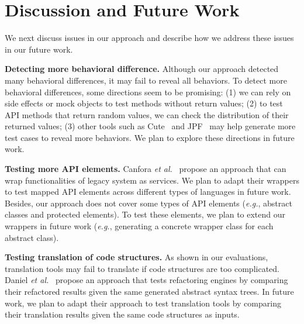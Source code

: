 

\section{Discussion and Future Work}
\label{sec:discuss}

We next discuss issues in our approach and describe how we address
these issues in our future work.

\textbf{Detecting more behavioral difference.} Although our approach detected many behavioral differences, it may fail to reveal all behaviors. To detect more behavioral differences, some directions seem to be promising: (1) we can rely on side effects or  mock objects to test methods without return values; (2) to test API methods that return random values, we can check the distribution of their returned values; (3) other tools such as Cute~\cite{koushik:cute} and JPF~\cite{visser2003mcp} may help generate more test cases to reveal more behaviors. We plan to explore these directions in future work.

\textbf{Testing more API elements.} Canfora \emph{et al.}~\cite{CanforaFFT08} propose an approach that can wrap functionalities of legacy system as services. We plan to adapt their wrappers to test mapped API elements across different types of languages in future work. Besides, our approach does not cover some types of API elements (\emph{e.g.}, abstract classes and protected elements). To test these elements, we plan to extend our wrappers in future work (\emph{e.g.}, generating a concrete wrapper class for each abstract class).

\textbf{Testing translation of code structures.} As shown in our evaluations, translation tools may fail to translate if code structures are too complicated. Daniel \emph{et al.}~\cite{daniel2007automated} propose an approach that tests refactoring engines by comparing their refactored results given the same generated abstract syntax trees. In future work, we plan to adapt their approach to test translation tools by comparing their translation results given the same code structures as inputs.


